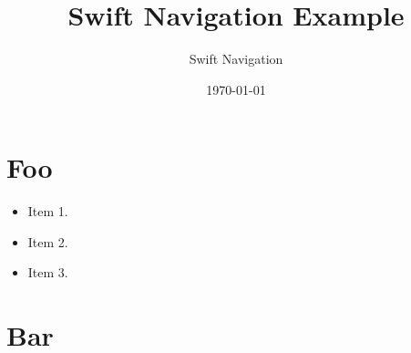 \documentclass{article}
\title{Swift Navigation Example}
\author{Swift Navigation}
\date{\today}
\begin{document}
\begingroup
  \maketitle
  \thispagestyle{fancy}
\endgroup

\begin{multicols*}{2}
\raggedcolumns

\section{Foo}
\large
\label{sec:Features}
\begin{itemize}
  \bulletnoindent
  \item Item 1.
  \item Item 2.
  \item Item 3.
\end{itemize}
\normalsize

\section{Bar}

\lipsum[1-5]

\end{multicols*} 
\end{document}
